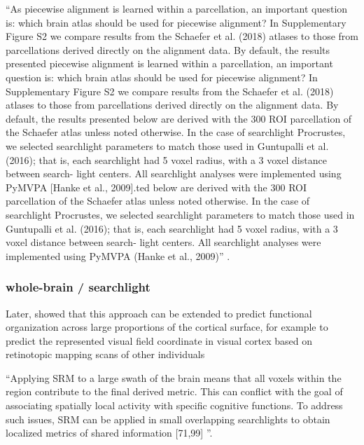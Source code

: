 ``As piecewise alignment is learned within a parcellation, an important
question is: which brain atlas should be used for piecewise alignment? In
Supplementary Figure S2 we compare results from the Schaefer et al. (2018)
atlases to those from parcellations derived directly on the alignment data. By
default, the results presented piecewise alignment is learned within a
parcellation, an important question is: which brain atlas should be used for
piecewise alignment? In Supplementary Figure S2 we compare results from the
Schaefer et al. (2018) atlases to those from parcellations derived directly on
the alignment data. By default, the results presented below are derived with
the 300 ROI parcellation of the Schaefer atlas unless noted otherwise. In the
case of searchlight Procrustes, we selected searchlight parameters to match
those used in Guntupalli et al. (2016); that is, each searchlight had 5 voxel
radius, with a 3 voxel distance between search- light centers. All searchlight
analyses were implemented using PyMVPA [Hanke et al., 2009].ted below are derived with the 300 ROI parcellation of the Schaefer atlas unless noted
otherwise. In the case of searchlight Procrustes, we selected searchlight
parameters to match those used in Guntupalli et al. (2016); that is, each
searchlight had 5 voxel radius, with a 3 voxel distance between search- light
centers. All searchlight analyses were implemented using PyMVPA (Hanke et al.,
2009)'' \citep{bazeille2021empirical}.

\subsubsection{whole-brain / searchlight}


Later, \citet{guntupalli2016model} showed that this approach can be extended to
predict functional organization across large proportions of the cortical
surface, for example to predict the represented visual field coordinate in
visual cortex based on retinotopic mapping scans of other individuals

``Applying SRM to a large swath of the brain means that all voxels within the
region contribute to the final derived metric. This can conflict with the goal
of associating spatially local activity with specific cognitive functions. To
address such issues, SRM can be applied in small overlapping searchlights to
obtain localized metrics of shared information [71,99]
\citep{cohen2017computational}''.

